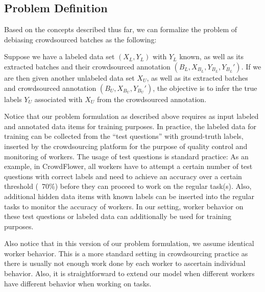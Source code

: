 
\subsection{Problem Definition}

Based on the concepts described thus far, 
we can formalize the problem of debiasing crowdsourced batches as the following:

\begin{problem} 
Suppose we have a labeled data set $(X_L, Y_L)$ with $Y_L$ known, 
as well as its extracted batches and their crowdsourced annotation $(B_L, X_{B_L}, Y_{B_L}, Y_{B_L}')$.  
If we are then given another unlabeled data set $X_U$, 
as well as its extracted batches and crowdsourced annotation $(B_U, X_{B_U}, Y_{B_U}')$, 
the objective is to infer the true labels $Y_{U}$ associated with $X_{U}$ from the crowdsourced annotation.  
\end{problem}
Notice that our problem formulation as described above requires
as input labeled and annotated data items for training purposes. 
In practice, the labeled data for training 
can be collected from the ``test questions'' 
with ground-truth labels, 
inserted by the crowdsourcing platform for the 
purpose of quality control and monitoring
of workers.  
The usage of test questions is standard practice: 
As an example, in CrowdFlower, all workers have to attempt a 
certain number of test questions with correct labels 
and need to achieve an accuracy over a certain threshold (\eg~70\%) 
before they can proceed to work on the regular task(s).  
Also, additional hidden data items with known labels 
can be inserted into the regular tasks
to monitor the accuracy of workers.  
In our setting, worker behavior on these
test questions or labeled data can additionally be used
for training purposes.


Also notice that in this version of our problem
formulation, we assume identical worker behavior.  
This is a more standard setting in crowdsourcing practice 
as there is usually not enough work done by each worker to ascertain individual behavior.
Also, it is straightforward to extend our model when 
different workers have different behavior when working on tasks.



